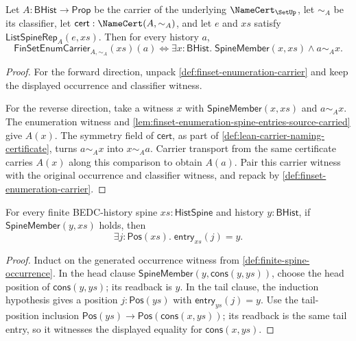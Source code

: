 \begin{theorem}
\label{thm:finset-enumeration-membership-exactness}
Let $A:\mathsf{BHist}\to\mathsf{Prop}$ be the carrier of the underlying $\NameCert_{\SetUp}$, let $\sim_A$ be its classifier, let $\mathsf{cert}:\NameCert(A,\sim_A)$, and let $e$ and $xs$ satisfy $\mathsf{ListSpineRep}_A(e,xs)$. Then for every history $a$,
$$
\mathsf{FinSetEnumCarrier}_{A,\sim_A}(xs)(a)
\Longleftrightarrow
\exists x:\mathsf{BHist}.\;\mathsf{SpineMember}(x,xs)\land a\sim_A x.
$$
\end{theorem}
\begin{proof}
For the forward direction, unpack \autoref{def:finset-enumeration-carrier} and keep the displayed occurrence and classifier witness.

For the reverse direction, take a witness $x$ with $\mathsf{SpineMember}(x,xs)$ and $a\sim_A x$. The enumeration witness and \autoref{lem:finset-enumeration-spine-entries-source-carried} give $A(x)$. The symmetry field of $\mathsf{cert}$, as part of \autoref{def:lean-carrier-naming-certificate}, turns $a\sim_A x$ into $x\sim_A a$. Carrier transport from the same certificate carries $A(x)$ along this comparison to obtain $A(a)$. Pair this carrier witness with the original occurrence and classifier witness, and repack by \autoref{def:finset-enumeration-carrier}.
\end{proof}



\begin{lemma}
\label{lem:finset-spine-member-position-readback}
For every finite BEDC-history spine $xs:\mathsf{HistSpine}$ and history $y:\mathsf{BHist}$, if $\mathsf{SpineMember}(y,xs)$ holds, then
$$
\exists j:\mathsf{Pos}(xs).\;\mathsf{entry}_{xs}(j)=y.
$$
\end{lemma}
\begin{proof}
Induct on the generated occurrence witness from \autoref{def:finite-spine-occurrence}. In the head clause $\mathsf{SpineMember}(y,\mathsf{cons}(y,ys))$, choose the head position of $\mathsf{cons}(y,ys)$; its readback is $y$. In the tail clause, the induction hypothesis gives a position $j:\mathsf{Pos}(ys)$ with $\mathsf{entry}_{ys}(j)=y$. Use the tail-position inclusion $\mathsf{Pos}(ys)\to\mathsf{Pos}(\mathsf{cons}(x,ys))$; its readback is the same tail entry, so it witnesses the displayed equality for $\mathsf{cons}(x,ys)$.
\end{proof}

